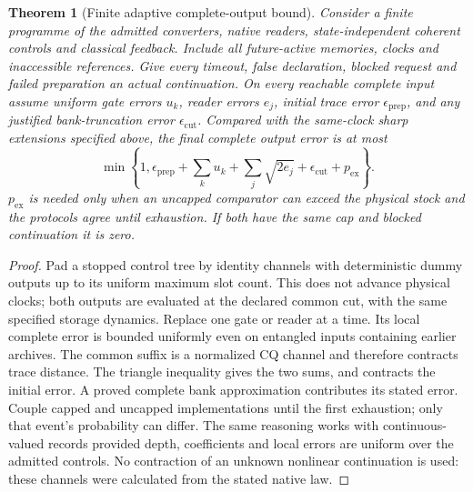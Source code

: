\documentclass[11pt,oneside,openany]{book}
\newtheorem{theorem}{Theorem}[chapter]
\theoremstyle{definition}
\theoremstyle{remark}\newtheorem{remark}[theorem]{Remark}
\begin{document}
\begin{theorem}[Finite adaptive complete-output bound]
\label{det:network}
Consider a finite programme of the admitted converters, native readers,
state-independent coherent controls and classical feedback. Include all
future-active memories, clocks and inaccessible references. Give every
timeout, false declaration, blocked request and failed preparation an
actual continuation. On every reachable complete input assume uniform
gate errors $u_k$, reader errors $e_j$, initial trace error
$\epsilon_{\mathrm{prep}}$, and any justified bank-truncation error
$\epsilon_{\mathrm{cut}}$. Compared with the same-clock sharp
extensions specified above, the final complete output error is at most
\begin{equation}
 \min\left\{1,\epsilon_{\mathrm{prep}}+
        \sum_k u_k+\sum_j\sqrt{2e_j}+
        \epsilon_{\mathrm{cut}}+p_{\mathrm{ex}}\right\}.     \label{det:network-error}
\end{equation}
$p_{\mathrm{ex}}$ is needed only when an uncapped comparator can exceed
the physical stock and the protocols agree until exhaustion. If both
have the same cap and blocked continuation it is zero.
\end{theorem}
\begin{proof}
Pad a stopped control tree by identity channels with deterministic dummy
outputs up to its uniform maximum slot count. This does not advance
physical clocks; both outputs are evaluated at the declared common
cut, with the same specified storage dynamics. Replace one gate or
reader at a time. Its local complete error is bounded uniformly even
on entangled inputs containing earlier archives. The common suffix
is a normalized CQ channel and therefore contracts trace distance.
The triangle inequality gives the two sums, and contracts the initial
error. A proved complete bank approximation contributes its stated
error. Couple capped and uncapped implementations until the first
exhaustion; only that event's probability can differ. The same
reasoning works with continuous-valued records provided depth,
coefficients and local errors are uniform over the admitted controls.
No contraction of an unknown nonlinear continuation is used: these
channels were calculated from the stated native law.
\end{proof}
\end{document}
